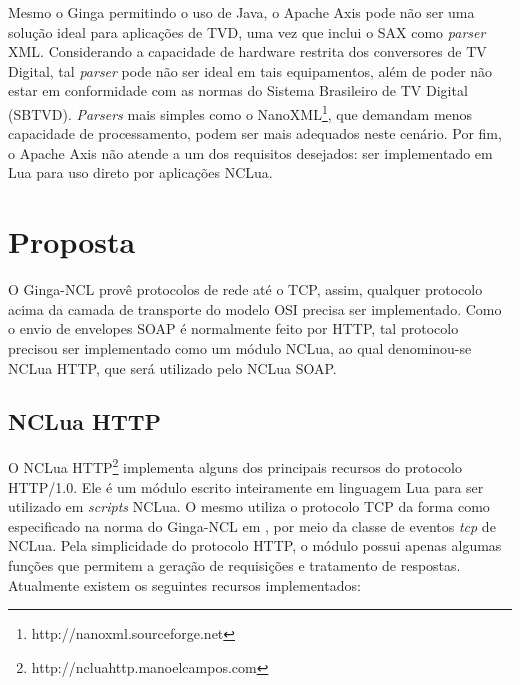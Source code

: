Mesmo o Ginga permitindo o uso de Java, o Apache Axis pode não ser uma solução ideal para
aplicações de TVD, uma vez que inclui o SAX como \textit{parser} XML.
Considerando a capacidade de hardware restrita dos conversores de TV Digital, tal \textit{parser} pode não ser ideal 
em tais equipamentos, além de poder não estar em conformidade com as normas do 
Sistema Brasileiro de TV Digital (SBTVD). \textit{Parsers} mais simples como o NanoXML\footnote{http://nanoxml.sourceforge.net}, 
que demandam menos capacidade de processamento, podem ser mais adequados neste cenário.
Por fim, o Apache Axis não atende a um dos requisitos desejados: ser implementado em Lua para uso direto por aplicações NCLua.

\begin{comment}
\begin{center}
	\texttt{[image: soap-toolkits.png]}
	\captionof{figure}{Tabela comparativa entre \textit{toolkits} SOAP \cite{louridas2006soap}}
	\label{fig:tabela-comparativa}
\end{center}
\end{comment}

\section{Proposta} \label{sec:modulos-implementados}

O Ginga-NCL provê protocolos de rede até o TCP, assim, qualquer protocolo acima da camada de transporte do modelo OSI precisa ser implementado.
Como o envio de envelopes SOAP é normalmente feito por HTTP, tal protocolo precisou ser implementado como um módulo NCLua,
ao qual denominou-se NCLua HTTP, que será utilizado pelo NCLua SOAP.

\subsection{NCLua HTTP} \label{sec:ncluahttp}

O NCLua HTTP\footnote{http://ncluahttp.manoelcampos.com} implementa alguns dos principais recursos do protocolo HTTP/1.0. 
Ele é um módulo escrito inteiramente em linguagem Lua
para ser utilizado em \textit{scripts} NCLua. O mesmo utiliza o protocolo TCP da forma como especificado na norma do Ginga-NCL
em \cite{abnt200815606}, por meio da classe de eventos \textit{tcp} de NCLua.
Pela simplicidade do protocolo HTTP, o módulo possui apenas algumas funções que permitem a geração
de requisições e tratamento de respostas. Atualmente existem os seguintes recursos implementados:

